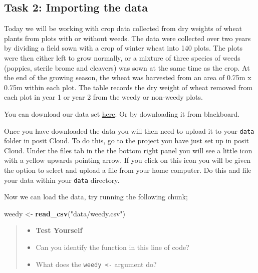 \documentclass[
]{book}
\newenvironment{Shaded}{\begin{snugshade}}{\end{snugshade}}
\newcommand{\FunctionTok}[1]{\textcolor[rgb]{0.13,0.29,0.53}{\textbf{#1}}}
\newcommand{\NormalTok}[1]{#1}
\newcommand{\OtherTok}[1]{\textcolor[rgb]{0.56,0.35,0.01}{#1}}
\newcommand{\StringTok}[1]{\textcolor[rgb]{0.31,0.60,0.02}{#1}}
\providecommand{\tightlist}{%
  \setlength{\itemsep}{0pt}\setlength{\parskip}{0pt}}
\begin{document}
\subsection{Task 2: Importing the data}\label{task-2-importing-the-data}

Today we will be working with crop data collected from dry weights of wheat plants from plots with or without weeds. The data were collected over two years by dividing a field sown with a crop of winter wheat into 140 plots. The plots were then either left to grow normally, or a mixture of three species of weeds (poppies, sterile brome and cleavers) was sown at the same time as the crop. At the end of the growing season, the wheat was harvested from an area of 0.75m x 0.75m within each plot. The table records the dry weight of wheat removed from each plot in year 1 or year 2 from the weedy or non-weedy plots.

You can download our data set \href{https://drive.google.com/uc?export=download&id=1qgIqvW56dSHb0dq07ZMU43POA0jkjuuR}{here}. Or by downloading it from blackboard.

Once you have downloaded the data you will then need to upload it to your \texttt{data} folder in posit Cloud. To do this, go to the project you have just set up in posit Cloud. Under the files tab in the the bottom right panel you will see a little icon with a yellow upwards pointing arrow. If you click on this icon you will be given the option to select and upload a file from your home computer. Do this and file your data within your \texttt{data} directory.

Now we can load the data, try running the following chunk;

\begin{Shaded}
\begin{Highlighting}[]
\NormalTok{weedy }\OtherTok{\textless{}{-}} \FunctionTok{read\_csv}\NormalTok{(}\StringTok{"data/weedy.csv"}\NormalTok{)}
\end{Highlighting}
\end{Shaded}

\begin{quote}
\begin{itemize}
\tightlist
\item
  \textbf{Test Yourself}
\item
  Can you identify the function in this line of code?
\item
  What does the \texttt{weedy\ \textless{}-} argument do?
\end{itemize}
\end{quote}
\end{document}
